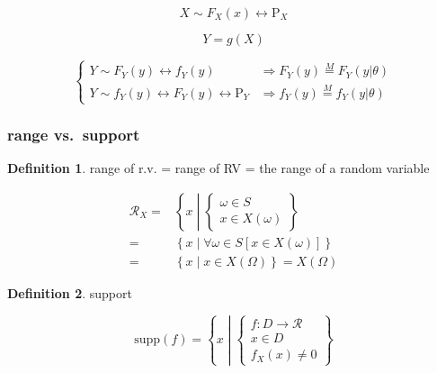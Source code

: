\documentclass[
]{book}
\theoremstyle{definition}
\newtheorem{definition}{Definition}[chapter]
\theoremstyle{definition}
\theoremstyle{definition}
\theoremstyle{definition}
\theoremstyle{remark}
\begin{document}
\[
X\sim F_{{\scriptscriptstyle X}}\left(x\right)\leftrightarrow\mathrm{P}_{{\scriptscriptstyle X}}
\]

\[
Y=g\left(X\right)
\]

\[
\begin{cases}
Y\sim F_{{\scriptscriptstyle Y}}\left(y\right)\leftrightarrow f_{{\scriptscriptstyle Y}}\left(y\right) & \Rightarrow F_{{\scriptscriptstyle Y}}\left(y\right)\overset{M}{=}F_{{\scriptscriptstyle Y}}\left(y|\theta\right)\\
Y\sim f_{{\scriptscriptstyle Y}}\left(y\right)\leftrightarrow F_{{\scriptscriptstyle Y}}\left(y\right)\leftrightarrow\mathrm{P}_{{\scriptscriptstyle Y}} & \Rightarrow f_{{\scriptscriptstyle Y}}\left(y\right)\overset{M}{=}f_{{\scriptscriptstyle Y}}\left(y|\theta\right)
\end{cases}
\]

\subsubsection{range vs.~support}\label{range-vs.-support}

\begin{definition}
\protect\hypertarget{def:unnamed-chunk-12}{}\label{def:unnamed-chunk-12}range of r.v. = range of RV = the range of a random variable
\end{definition}

\[
\begin{aligned}
\mathcal{R}_{{\scriptscriptstyle X}}=&\left\{ x\middle|\begin{cases}
\omega\in S\\
x\in X\left(\omega\right)
\end{cases}\right\} \\=&\left\{ x\middle|\forall\omega\in S\left[x\in X\left(\omega\right)\right]\right\} \\=&\left\{ x\middle|x\in X\left(\Omega\right)\right\} =X\left(\Omega\right)
\end{aligned}
\]

\begin{definition}
\protect\hypertarget{def:unnamed-chunk-13}{}\label{def:unnamed-chunk-13}support
\end{definition}

\[
\mathrm{supp}\left(f\right)=\left\{ x\middle|\begin{cases}
f:D\rightarrow\mathcal{R}\\
x\in D\\
f_{{\scriptscriptstyle X}}\left(x\right)\ne0
\end{cases}\right\} 
\]
\end{document}
